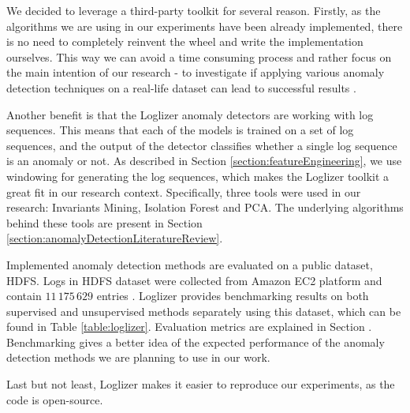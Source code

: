 We decided to leverage a third-party toolkit for several reason. Firstly, as the algorithms we are using in our experiments have been already implemented, there is no need to completely reinvent the wheel and write the implementation ourselves. This way we can avoid a time consuming process and rather focus on the main intention of our research - to investigate if applying various anomaly detection techniques on a real-life dataset can lead to successful results .

Another benefit is that the Loglizer anomaly detectors are working with log sequences. This means that each of the models is trained on a set of log sequences, and the output of the detector classifies whether a single log sequence is an anomaly or not. As described in Section \ref{section:featureEngineering}, we use windowing for generating the log sequences, which makes the Loglizer toolkit a great fit in our research context. Specifically, three  tools were used in our research: Invariants Mining, Isolation Forest and PCA. The underlying algorithms behind these tools are present in Section \ref{section:anomalyDetectionLiteratureReview}.

Implemented anomaly detection methods are evaluated on a public dataset, HDFS. Logs in HDFS dataset were collected from Amazon EC2 platform and contain $11\,175\,629$ entries \cite{xu2009}. Loglizer provides benchmarking results on both supervised and unsupervised methods separately using this dataset, which can be found in Table \ref{table:loglizer}. Evaluation metrics are explained in Section . Benchmarking gives a better idea of the expected performance of the anomaly detection methods we are planning to use in our work. 

Last but not least, Loglizer makes it easier to reproduce our experiments, as the code is open-source.

